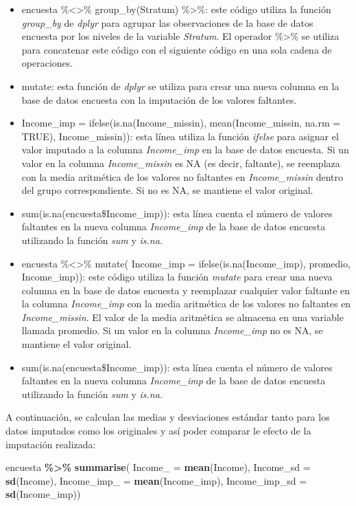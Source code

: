 \documentclass[
  spanish,
  12pt,
]{book}
\newenvironment{Shaded}{\begin{snugshade}}{\end{snugshade}}
\newcommand{\AttributeTok}[1]{\textcolor[rgb]{0.13,0.29,0.53}{#1}}
\newcommand{\FunctionTok}[1]{\textcolor[rgb]{0.13,0.29,0.53}{\textbf{#1}}}
\newcommand{\NormalTok}[1]{#1}
\newcommand{\SpecialCharTok}[1]{\textcolor[rgb]{0.81,0.36,0.00}{\textbf{#1}}}
\begin{document}
\begin{itemize}
\item
  encuesta \%\textless\textgreater\% group\_by(Stratum) \%\textgreater\%: este código utiliza la función \emph{group\_by} de \emph{dplyr} para agrupar las observaciones de la base de datos encuesta por los niveles de la variable \emph{Stratum}. El operador \%\textgreater\% se utiliza para concatenar este código con el siguiente código en una sola cadena de operaciones.
\item
  mutate: esta función de \emph{dplyr} se utiliza para crear una nueva columna en la base de datos encuesta con la imputación de los valores faltantes.
\item
  Income\_imp = ifelse(is.na(Income\_missin), mean(Income\_missin, na.rm = TRUE), Income\_missin)): esta línea utiliza la función \emph{ifelse} para asignar el valor imputado a la columna \emph{Income\_imp} en la base de datos encuesta. Si un valor en la columna \emph{Income\_missin} es NA (es decir, faltante), se reemplaza con la media aritmética de los valores no faltantes en \emph{Income\_missin} dentro del grupo correspondiente. Si no es NA, se mantiene el valor original.
\item
  sum(is.na(encuesta\$Income\_imp)): esta línea cuenta el número de valores faltantes en la nueva columna \emph{Income\_imp} de la base de datos encuesta utilizando la función \emph{sum} y \emph{is.na}.
\item
  encuesta \%\textless\textgreater\% mutate( Income\_imp = ifelse(is.na(Income\_imp), promedio, Income\_imp)): este código utiliza la función \emph{mutate} para crear una nueva columna en la base de datos encuesta y reemplazar cualquier valor faltante en la columna \emph{Income\_imp} con la media aritmética de los valores no faltantes en \emph{Income\_missin}. El valor de la media aritmética se almacena en una variable llamada promedio. Si un valor en la columna \emph{Income\_imp} no es NA, se mantiene el valor original.
\item
  sum(is.na(encuesta\$Income\_imp)): esta línea cuenta el número de valores faltantes en la nueva columna \emph{Income\_imp} de la base de datos encuesta utilizando la función \emph{sum} y \emph{is.na}.
\end{itemize}

A continuación, se calculan las medias y desviaciones estándar tanto para los datos imputados como los originales y así poder comparar le efecto de la imputación realizada:

\begin{Shaded}
\begin{Highlighting}[]
\NormalTok{encuesta }\SpecialCharTok{\%\textgreater{}\%} \FunctionTok{summarise}\NormalTok{(}
  \AttributeTok{Income\_ =} \FunctionTok{mean}\NormalTok{(Income),}
  \AttributeTok{Income\_sd =} \FunctionTok{sd}\NormalTok{(Income),}
  \AttributeTok{Income\_imp\_ =} \FunctionTok{mean}\NormalTok{(Income\_imp),}
  \AttributeTok{Income\_imp\_sd =} \FunctionTok{sd}\NormalTok{(Income\_imp))}
\end{Highlighting}
\end{Shaded}
\end{document}
